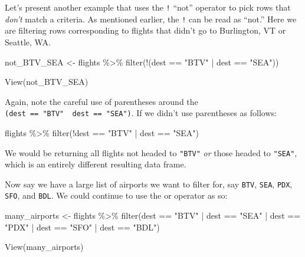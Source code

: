 \documentclass[
  letterpaper,
  DIV=11,
  numbers=noendperiod]{scrreprt}
\newenvironment{Shaded}{\begin{snugshade}}{\end{snugshade}}
\newcommand{\FunctionTok}[1]{\textcolor[rgb]{0.28,0.35,0.67}{#1}}
\newcommand{\NormalTok}[1]{\textcolor[rgb]{0.00,0.23,0.31}{#1}}
\newcommand{\OtherTok}[1]{\textcolor[rgb]{0.00,0.23,0.31}{#1}}
\newcommand{\SpecialCharTok}[1]{\textcolor[rgb]{0.37,0.37,0.37}{#1}}
\newcommand{\StringTok}[1]{\textcolor[rgb]{0.13,0.47,0.30}{#1}}
\theoremstyle{definition}
\theoremstyle{remark}
\begin{document}
Let's present another example that uses the \texttt{!} ``not'' operator
to pick rows that \emph{don't} match a criteria. As mentioned earlier,
the \texttt{!} can be read as ``not.'' Here we are filtering rows
corresponding to flights that didn't go to Burlington, VT or Seattle,
WA.

\begin{Shaded}
\begin{Highlighting}[]
\NormalTok{not\_BTV\_SEA }\OtherTok{\textless{}{-}}\NormalTok{ flights }\SpecialCharTok{\%\textgreater{}\%} 
  \FunctionTok{filter}\NormalTok{(}\SpecialCharTok{!}\NormalTok{(dest }\SpecialCharTok{==} \StringTok{"BTV"} \SpecialCharTok{|}\NormalTok{ dest }\SpecialCharTok{==} \StringTok{"SEA"}\NormalTok{))}

\FunctionTok{View}\NormalTok{(not\_BTV\_SEA)}
\end{Highlighting}
\end{Shaded}

Again, note the careful use of parentheses around the
\texttt{(dest\ ==\ "BTV"\ \textbar{}\ dest\ ==\ "SEA")}. If we didn't
use parentheses as follows:

\begin{Shaded}
\begin{Highlighting}[]
\NormalTok{flights }\SpecialCharTok{\%\textgreater{}\%} 
  \FunctionTok{filter}\NormalTok{(}\SpecialCharTok{!}\NormalTok{dest }\SpecialCharTok{==} \StringTok{"BTV"} \SpecialCharTok{|}\NormalTok{ dest }\SpecialCharTok{==} \StringTok{"SEA"}\NormalTok{)}
\end{Highlighting}
\end{Shaded}

We would be returning all flights not headed to \texttt{"BTV"} \emph{or}
those headed to \texttt{"SEA"}, which is an entirely different resulting
data frame.

Now say we have a large list of airports we want to filter for, say
\texttt{BTV}, \texttt{SEA}, \texttt{PDX}, \texttt{SFO}, and
\texttt{BDL}. We could continue to use the \texttt{\textbar{}} or
operator as so:

\begin{Shaded}
\begin{Highlighting}[]
\NormalTok{many\_airports }\OtherTok{\textless{}{-}}\NormalTok{ flights }\SpecialCharTok{\%\textgreater{}\%} 
  \FunctionTok{filter}\NormalTok{(dest }\SpecialCharTok{==} \StringTok{"BTV"} \SpecialCharTok{|}\NormalTok{ dest }\SpecialCharTok{==} \StringTok{"SEA"} \SpecialCharTok{|}\NormalTok{ dest }\SpecialCharTok{==} \StringTok{"PDX"} \SpecialCharTok{|}\NormalTok{ dest }\SpecialCharTok{==} \StringTok{"SFO"} \SpecialCharTok{|}\NormalTok{ dest }\SpecialCharTok{==} \StringTok{"BDL"}\NormalTok{)}

\FunctionTok{View}\NormalTok{(many\_airports)}
\end{Highlighting}
\end{Shaded}
\end{document}
